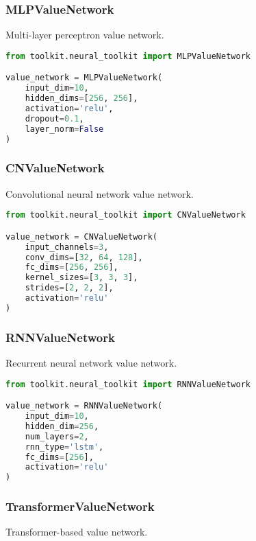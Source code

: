 \subsubsection{MLPValueNetwork}

Multi-layer perceptron value network.

\begin{lstlisting}[language=python, caption=MLP Value Network]
from toolkit.neural_toolkit import MLPValueNetwork

value_network = MLPValueNetwork(
    input_dim=10,
    hidden_dims=[256, 256],
    activation='relu',
    dropout=0.1,
    layer_norm=False
)
\end{lstlisting}

\subsubsection{CNValueNetwork}

Convolutional neural network value network.

\begin{lstlisting}[language=python, caption=CNN Value Network]
from toolkit.neural_toolkit import CNValueNetwork

value_network = CNValueNetwork(
    input_channels=3,
    conv_dims=[32, 64, 128],
    fc_dims=[256, 256],
    kernel_sizes=[3, 3, 3],
    strides=[2, 2, 2],
    activation='relu'
)
\end{lstlisting}

\subsubsection{RNNValueNetwork}

Recurrent neural network value network.

\begin{lstlisting}[language=python, caption=RNN Value Network]
from toolkit.neural_toolkit import RNNValueNetwork

value_network = RNNValueNetwork(
    input_dim=10,
    hidden_dim=256,
    num_layers=2,
    rnn_type='lstm',
    fc_dims=[256],
    activation='relu'
)
\end{lstlisting}

\subsubsection{TransformerValueNetwork}

Transformer-based value network.

